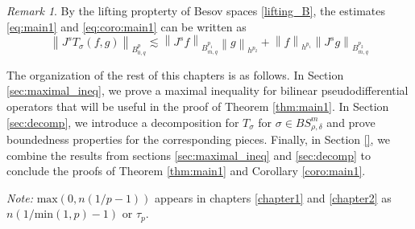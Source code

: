 \documentclass[final,letterpaper,12pt,oneside]{class_diss}
\theoremstyle{remark}
\newtheorem{remark}{Remark}[section]
\newcommand{\ibes}[3]{B_{#1,#3}^{#2}} %
\newcommand{\norm}[2]{\left\|#1\right\|_{#2}}
\begin{document}
\begin{remark}\label{remark_3}
By the lifting propterty of Besov spaces \eqref{lifting_B}, the estimates \eqref{eq:main1} and \eqref{eq:coro:main1} can be written as 
$$ \norm{J^s T_\sigma(f,g)}{\ibes{0}{p}{q}}\lesssim \norm{J^s f}{\ibes{\bar{m}}{p_1}{q}}\norm{g}{h^{p_2}} +\norm{f}{h^{p_1}}\norm{J^s g}{\ibes{\bar{m}}{p_2}{q}}  $$
\end{remark}

The organization of the rest of this chapters is as follows. In Section \ref{sec:maximal_ineq}, we prove a maximal inequality for bilinear pseudodifferential operators that will be useful in the proof of Theorem \ref{thm:main1}. In Section \ref{sec:decomp}, we introduce a decomposition for $T_\sigma$ for $\sigma \in BS^m_{\rho,\delta}$ and prove boundedness properties for the corresponding pieces. Finally, in Section \ref{}, we combine the results from sections \ref{sec:maximal_ineq} and \ref{sec:decomp} to conclude the proofs of Theorem \ref{thm:main1} and Corollary \ref{coro:main1}.

\textit{Note:} $\text{max}(0,n(1/p - 1))$ appears in chapters \ref{chapter1} and \ref{chapter2} as $n(1/\text{min}(1,p) - 1)$ or $\tau_p$. 
\end{document}
